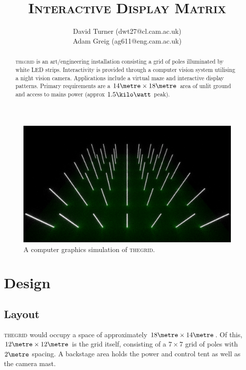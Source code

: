 \documentclass[12pt]{article} %
\title{\thegrid\\\small{\textsc{Interactive Display Matrix}}}
\author{\small{David Turner (dwt27@cl.cam.ac.uk)}\\
        \small{Adam Greig (ag611@eng.cam.ac.uk)}}
\date{} %
\newcommand{\thegrid}{\textsc{the\textperiodcentered grid}\xspace}
\begin{document}
\maketitle

\renewcommand{\abstractname}{Summary}
\begin{abstract}
\thegrid is an art/engineering installation consisting a grid of poles
illuminated by white LED strips.  Interactivity is provided through a computer
vision system utilising a night vision camera.  Applications include a virtual
maze and interactive display patterns.  Primary requirements are a $14\metre
\times 18\metre$ area of unlit ground and access to mains power (approx
$1.5\kilo\watt$ peak).
\end{abstract}

\begin{figure}[h]
    \centering
    \includegraphics[width=\textwidth]{pics/render1.png}
    \caption{A computer graphics simulation of \thegrid.}
\end{figure}

\clearpage
\section{Design}
\subsection{Layout}
\thegrid would occupy a space of approximately $18\metre \times 14\metre$.  Of
this, $12\metre \times 12\metre$ is the grid itself, consisting of a $7 \times
7$ grid of poles with $2\metre$ spacing.  A backstage area holds the power and
control tent as well as the camera mast.
\end{document}
